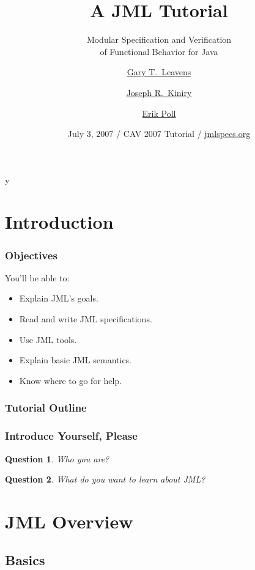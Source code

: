 \if y\MAKEHANDOUTS \documentclass[compress,landscape,handout]{beamer}
\title[JML Tutorial]{A JML Tutorial}
\subtitle{Modular Specification and Verification \\
of Functional Behavior for Java}
\author[Gary T. Leavens] %
{\href{http://www.cs.iastate.edu/~leavens/}{Gary T.~Leavens}\inst{1}
  \and \href{http://secure.ucd.ie/~kiniry/}{Joseph R.~Kiniry}\inst{2}
  \and \href{http://www.cs.ru.nl/~erikpoll/}{Erik Poll}\inst{3}}
\institute[ISU] %
{
  \inst{1}%
  Department of Computer Science\\
  Iowa State University (moving to UCF)
  \and
  \inst{2}%
  School of Computer Science and Informatics \\
  University College Dublin
  \and
  \inst{3}%
  Computing Science Department \\
  Radboud University Nijmegen
}
\date[CAV 2007]{July 3, 2007 / CAV 2007 Tutorial / \href{http://www.jmlspecs.org}{jmlspecs.org}}
\newtheorem*{question}{Question}
\begin{document}
\begin{frame}
  \titlepage
\end{frame}

\section*{Introduction}

\begin{frame}
\frametitle{Objectives}

You'll be able to:
  \begin{itemize}
  \item
    Explain JML's goals.
  \item
    Read and write JML specifications.
  \item
    Use JML tools.
  \item
    Explain basic JML semantics.
  \item
    Know where to go for help.
  \end{itemize}
\end{frame}

\begin{frame}
\frametitle{Tutorial Outline}
  \tableofcontents[hideallsubsections] %
\end{frame}

\begin{frame}
\frametitle{Introduce Yourself, Please}

\begin{question}
Who you are?
\end{question}

\begin{question}
What do you want to learn about JML?
\end{question}
\end{frame}


\section{JML Overview}

\subsection[Basics]{Basics}
\end{document}
